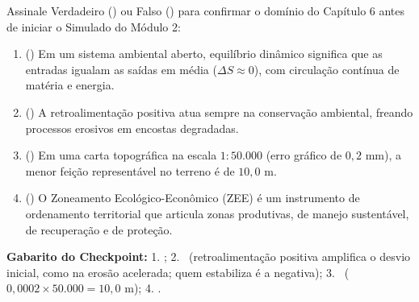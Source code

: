 \begin{boxTeste}
  Assinale Verdadeiro (\V) ou Falso (\F) para confirmar o domínio do Capítulo 6 antes de iniciar o Simulado do Módulo 2:
  \begin{enumerate}[leftmargin=1.8em, itemsep=3pt]
    \item (\quad) Em um sistema ambiental aberto, equilíbrio dinâmico significa que as entradas igualam as saídas em média ($\Delta S \approx 0$), com circulação contínua de matéria e energia.
    \item (\quad) A retroalimentação positiva atua sempre na conservação ambiental, freando processos erosivos em encostas degradadas.
    \item (\quad) Em uma carta topográfica na escala $1{:}50.000$ (erro gráfico de $0{,}2\text{ mm}$), a menor feição representável no terreno é de $10{,}0\text{ m}$.
    \item (\quad) O Zoneamento Ecológico-Econômico (ZEE) é um instrumento de ordenamento territorial que articula zonas produtivas, de manejo sustentável, de recuperação e de proteção.
  \end{enumerate}
  \vspace{4pt}
  {\footnotesize\textbf{Gabarito do Checkpoint:} 1. \V; 2. \F\ (retroalimentação positiva amplifica o desvio inicial, como na erosão acelerada; quem estabiliza é a negativa); 3. \V\ ($0{,}0002 \times 50.000 = 10{,}0\text{ m}$); 4. \V.}
\end{boxTeste}
